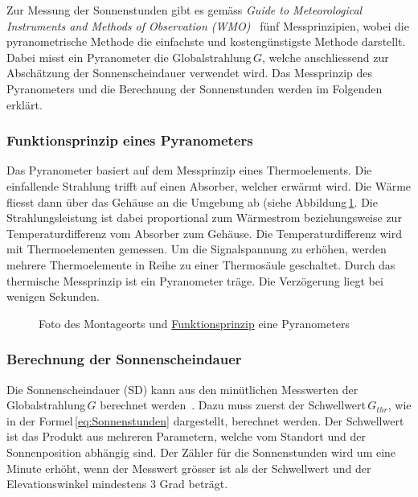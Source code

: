 \noindent
Zur Messung der Sonnenstunden gibt es gemäss \emph{Guide to Meteorological Instruments and Methods of Observation (WMO)}~\cite{WMO2014Gtmi} fünf Messprinzipien, wobei die pyranometrische Methode die einfachste und kostengünstigste Methode darstellt. Dabei misst ein Pyranometer die Globalstrahlung\,$G$, welche anschliessend zur Abschätzung der Sonnenscheindauer verwendet wird. Das Messprinzip des Pyranometers und die Berechnung der Sonnenstunden werden im Folgenden erklärt.

\subsubsection{Funktionsprinzip eines Pyranometers}
Das Pyranometer basiert auf dem Messprinzip eines Thermoelements. Die einfallende Strahlung trifft auf einen Absorber, welcher erwärmt wird. Die Wärme fliesst dann über das Gehäuse an die Umgebung ab (siehe Abbildung\,\ref{img:pyranometer}. Die Strahlungsleistung ist dabei proportional zum Wärmestrom beziehungsweise zur Temperaturdifferenz vom Absorber zum Gehäuse. Die Temperaturdifferenz wird mit Thermoelementen gemessen. Um die Signalspannung zu erhöhen, werden mehrere Thermoelemente in Reihe zu einer Thermosäule geschaltet. Durch das thermische Messprinzip ist ein Pyranometer träge. Die Verzögerung liegt bei wenigen Sekunden.

\begin{figure}[htbp]
	\centering
	\caption{Foto des Montageorts und \href{http://www.kippzonen.com/News/572/The-Working-Principle-of-a-Thermopile-Pyranometer}{Funktionsprinzip} eine Pyranometers }
	\label{img:pyranometer}
\end{figure}


\subsubsection{Berechnung der Sonnenscheindauer}
Die Sonnenscheindauer (SD) kann aus den minütlichen Messwerten der Globalstrahlung\,$G$ berechnet werden~\cite{WMO2014Gtmi}. Dazu muss zuerst der Schwellwert\,$G_{thr}$, wie in der Formel\,\ref{eq:Sonnenstunden} dargestellt, berechnet werden. Der Schwellwert ist das Produkt aus mehreren Parametern, welche vom Standort und der Sonnenposition abhängig sind. Der Zähler für die Sonnenstunden wird um eine Minute erhöht, wenn der Messwert grösser ist als der Schwellwert und der Elevationswinkel mindestens 3 Grad beträgt.

